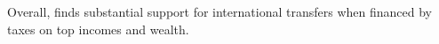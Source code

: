Overall, \citet{fabre_public_2026} finds substantial support for international transfers when financed by  taxes on top incomes and wealth. 

